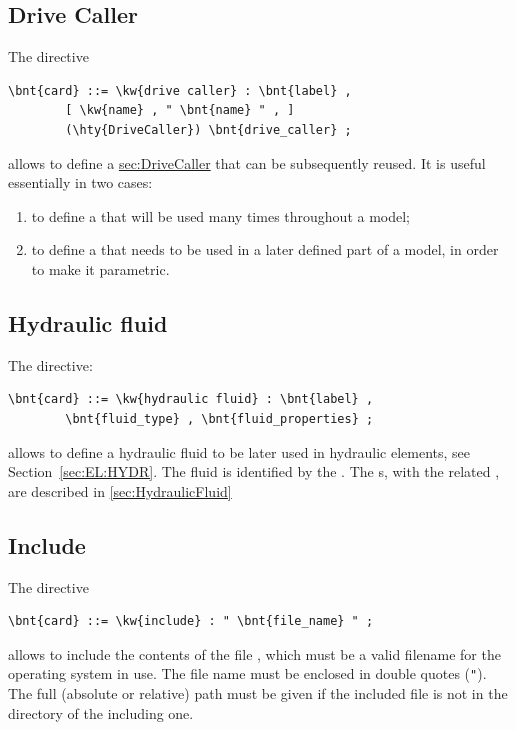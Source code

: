 \subsection{Drive Caller}\label{sec:DRIVE-CALLER}
The  directive
\begin{Verbatim}[commandchars=\\\{\}]
    \bnt{card} ::= \kw{drive caller} : \bnt{label} ,
        [ \kw{name} , " \bnt{name} " , ]
        (\hty{DriveCaller}) \bnt{drive_caller} ;
\end{Verbatim}
allows to define
a \hyperref{\kw{drive caller}}{\kw{drive caller} (see Section~}{)}{sec:DriveCaller}
that can be subsequently reused.
It is useful essentially in two cases:
\begin{enumerate}
	\renewcommand{\labelenumi}{\alph{enumi})}
	\item to define a 
	that will be used many times throughout a model;
	\item to define a  
	that needs to be used in a later defined part of a model, 
	in order to make it parametric.
\end{enumerate}



\subsection{Hydraulic fluid}\label{sec:HYDRAULIC-FLUID}
The  directive:
\begin{Verbatim}[commandchars=\\\{\}]
    \bnt{card} ::= \kw{hydraulic fluid} : \bnt{label} , 
        \bnt{fluid_type} , \bnt{fluid_properties} ;
\end{Verbatim}
allows to define a hydraulic fluid to be later used in hydraulic elements,
see Section~\ref{sec:EL:HYDR}.
The fluid is identified by the . 
The s, with the related , are
described in \ref{sec:HydraulicFluid}



\subsection{Include}\label{sec:INCLUDE}
The  directive
\begin{Verbatim}[commandchars=\\\{\}]
    \bnt{card} ::= \kw{include} : " \bnt{file_name} " ;
\end{Verbatim}
allows to include the contents of the file
,
which must be a valid filename for the operating system in
use.
The file name must be enclosed in double quotes (\texttt{"}).
The full (absolute or relative) path must be given if the included file 
is not in the directory of the including one.

